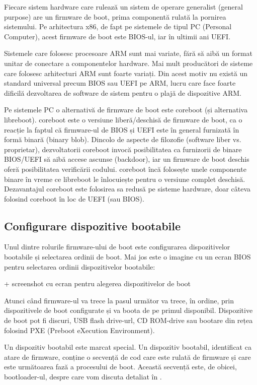 Fiecare sistem hardware care rulează un sistem de operare generalist (general
purpose) are un firmware de boot, prima componentă rulată la pornirea
sistemului. Pe arhitectura x86, de fapt pe sistemele de tipul PC (Personal
Computer), acest firmware de boot este BIOS-ul, iar în ultimii ani UEFI.

Sistemele care folosesc procesoare ARM sunt mai variate, fără să aibă un format
unitar de conectare a componentelor hardware. Mai mult producători de sisteme
care folosesc arhitecturi ARM sunt foarte variați. Din acest motiv nu există un
standard universal precum BIOS sau UEFI pe ARM, lucru care face foarte dificilă
dezvoltarea de software de sistem pentru o plajă de dispozitive ARM.

Pe sistemele PC o alternativă de firmware de boot este coreboot (și alternativa
libreboot). coreboot este o versiune liberă/deschisă de firmware de boot, ca o
reacție la faptul că firmware-ul de BIOS și UEFI este în general furnizată în
formă binară (binary blob). Dincolo de aspecte de filozofie (software liber vs.
proprietar), dezvoltatorii coreboot invocă posibilitatea ca furnizorii de binare
BIOS/UEFI să aibă accese ascunse (backdoor), iar un firmware de boot deschis
oferă posibilitatea verificării codului. coreboot încă folosește unele
componente binare în vreme ce libreboot le înlocuiește pentru o versiune complet
deschisă. Dezavantajul coreboot este folosirea sa redusă pe sisteme hardware,
doar câteva folosind coreboot în loc de UEFI (sau BIOS).

\subsection{Configurare dispozitive bootabile}
\label{sec:boot-firmware-devices}

Unul dintre rolurile firmware-ului de boot este configurarea dispozitivelor
bootabile și selectarea ordinii de boot. Mai jos este o imagine cu un ecran BIOS
pentru selectarea ordinii dispozitivelor bootabile:

+     screenshot cu ecran pentru alegerea dispozitivelor de boot

Atunci când firmware-ul va trece la pasul următor va trece, în ordine, prin
dispozitivele de boot configurate și va boota de pe primul disponibil.
Dispozitive de boot pot fi discuri, USB flash drive-url, CD ROM-drive sau
bootare din rețea folosind PXE (Preboot eXecution Environment).

Un dispozitiv bootabil este marcat special. Un dispozitiv bootabil, identificat
ca atare de firmware, conține o secvență de cod care este rulată de firmware și
care este următoarea fază a procesului de boot. Această secvență este, de
obicei, bootloader-ul, despre care vom discuta detaliat în
.

